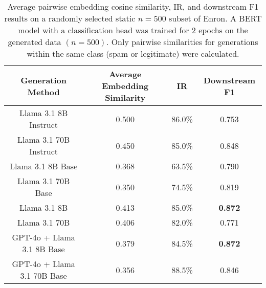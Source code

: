 \begin{table}[H]
\caption{Average pairwise embedding cosine similarity, IR, and downstream F1 results on a randomly selected static $n=500$ subset of Enron. A BERT model with a classification head was trained for $2$ epochs on the generated data $(n = 500)$. Only pairwise similarities for generations within the same class (spam or legitimate) were calculated.}
\label{enron-core}
\vskip 0.1in
\begin{center}
\begin{small}
\begin{sc}
\begin{tabular}{c|ccc}
\toprule
Generation Method & Average Embedding Similarity & IR & Downstream F1 \\
\midrule
Llama 3.1 8B Instruct              & 0.500 & 86.0\% & 0.753 \\
Llama 3.1 70B Instruct             & 0.450 & 85.0\% & 0.848 \\
Llama 3.1 8B Base                  & 0.368 & 63.5\% & 0.790 \\
Llama 3.1 70B Base                 & 0.350 & 74.5\% & 0.819 \\
\Sys{} Llama 3.1 8B                & 0.413 & 85.0\% & \textbf{0.872} \\
\Sys{} Llama 3.1 70B               & 0.406 & 82.0\% & 0.771 \\
\Sys{} GPT-4o + Llama 3.1 8B Base  & 0.379 & 84.5\% & \textbf{0.872} \\
\Sys{} GPT-4o + Llama 3.1 70B Base & 0.356 & 88.5\% & 0.846 \\
\bottomrule
\end{tabular}
\end{sc}
\end{small}
\end{center}
\vskip -0.1in
\end{table}
